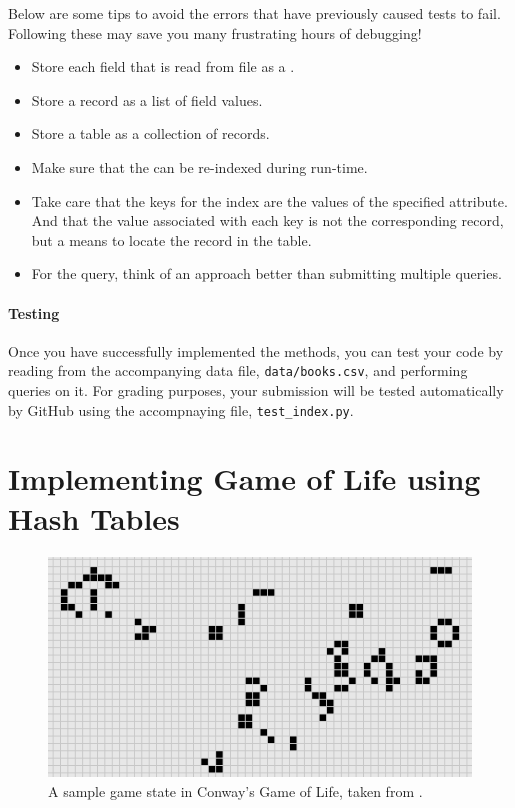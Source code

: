 \documentclass[addpoints]{exam}
\begin{document}
  Below are some tips to avoid the errors that have previously caused tests to fail. Following these may save you many frustrating hours of debugging!
  \begin{itemize}
  \item Store each field that is read from file as a .
  \item Store a record as a list of field values.
  \item Store a table as a collection of records.
  \item Make sure that the  can be re-indexed during run-time.
  \item Take care that the keys for the index are the values of the specified attribute. And that the value associated with each key is not the corresponding record, but a means to locate the record in the table.
  \item For the  query, think of an approach better than submitting multiple  queries.
  \end{itemize}

  \subsection{Testing}

  Once you have successfully implemented the methods, you can test your code by reading from the accompanying data file, \texttt{data/books.csv}, and performing queries on it. For grading purposes, your submission will be tested automatically by GitHub using the accompnaying  file, \texttt{test\_index.py}.

\newpage
\part{Implementing Game of Life using Hash Tables}
  
\begin{figure}[!h]
  \centering
  \includegraphics[scale=.8]{banner}
  \caption{A sample game state in Conway's Game of Life, taken from \cite{chaos}.} %
\end{figure}
\end{document}
